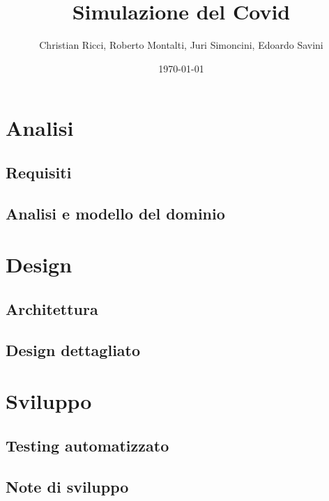 \documentclass[a4paper,12pt]{report}
\title{Simulazione del Covid}
\author{Christian Ricci, Roberto Montalti, Juri Simoncini, Edoardo Savini}
\date{\today}
\begin{document}
\maketitle

\begin{abstract}
\end{abstract}

\tableofcontents

\chapter{Analisi}

\section{Requisiti}

\section{Analisi e modello del dominio}


\chapter{Design}

\section{Architettura}

\section{Design dettagliato}

\chapter{Sviluppo}
\section{Testing automatizzato}

\section{Note di sviluppo}
\end{document}
